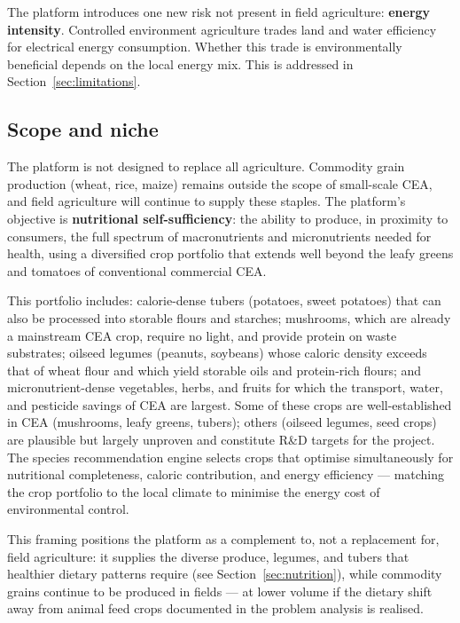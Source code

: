 The platform introduces one new risk not present in field agriculture: \textbf{energy intensity}. Controlled environment agriculture trades land and water efficiency for electrical energy consumption. Whether this trade is environmentally beneficial depends on the local energy mix. This is addressed in Section~\ref{sec:limitations}.

\subsection{Scope and niche}

The platform is not designed to replace all agriculture. Commodity grain production (wheat, rice, maize) remains outside the scope of small-scale CEA, and field agriculture will continue to supply these staples. The platform's objective is \textbf{nutritional self-sufficiency}: the ability to produce, in proximity to consumers, the full spectrum of macronutrients and micronutrients needed for health, using a diversified crop portfolio that extends well beyond the leafy greens and tomatoes of conventional commercial CEA.

This portfolio includes: calorie-dense tubers (potatoes, sweet potatoes) that can also be processed into storable flours and starches; mushrooms, which are already a mainstream CEA crop, require no light, and provide protein on waste substrates; oilseed legumes (peanuts, soybeans) whose caloric density exceeds that of wheat flour and which yield storable oils and protein-rich flours; and micronutrient-dense vegetables, herbs, and fruits for which the transport, water, and pesticide savings of CEA are largest. Some of these crops are well-established in CEA (mushrooms, leafy greens, tubers); others (oilseed legumes, seed crops) are plausible but largely unproven and constitute R\&D targets for the project. The species recommendation engine selects crops that optimise simultaneously for nutritional completeness, caloric contribution, and energy efficiency --- matching the crop portfolio to the local climate to minimise the energy cost of environmental control.

This framing positions the platform as a complement to, not a replacement for, field agriculture: it supplies the diverse produce, legumes, and tubers that healthier dietary patterns require (see Section~\ref{sec:nutrition}), while commodity grains continue to be produced in fields --- at lower volume if the dietary shift away from animal feed crops documented in the problem analysis is realised.

